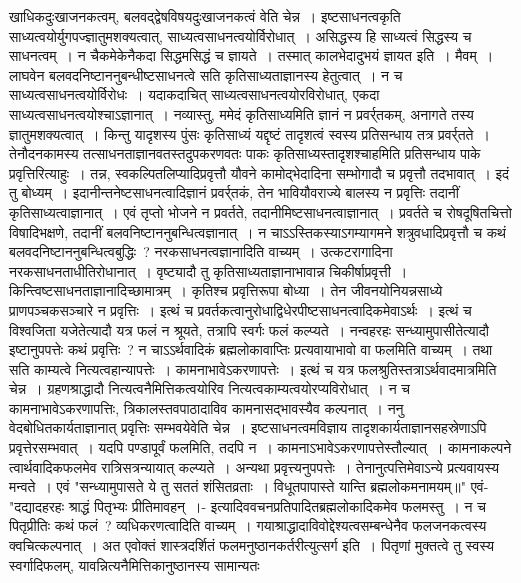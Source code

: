 खाधिकदुःखाजनकत्वम्, बलवद्द्वेषविषयदुःखाजनकत्वं वेति चेन्न~। इष्टसाधनत्वकृति साध्यत्वयोर्युगपज्ज्ञातुमशक्यत्वात्, साध्यत्वसाधनत्वयोर्विरोधात्~। असिद्धस्य हि
साध्यत्वं सिद्धस्य च साधनत्वम्~। न चैकमेकेनैकदा सिद्धमसिद्धं च ज्ञायते~। तस्मात् कालभेदादुभयं ज्ञायत इति~।
मैवम्~। लाघवेन बलवदनिष्टाननुबन्धीष्टसाधनत्वे सति कृतिसाध्यताज्ञानस्य हेतुत्वात्~। न च साध्यत्वसाधनत्वयोर्विरोधः~। यदाकदाचित् साध्यत्वसाधनत्वयोरविरोधात्,
एकदा साध्यत्वसाधनत्वयोश्चाऽज्ञानात्~। नव्यास्तु, ममेदं कृतिसाध्यमिति ज्ञानं न प्रवर्र्तकम्, अनागते तस्य ज्ञातुमशक्यत्वात्~। किन्तु यादृशस्य पुंसः कृतिसाध्यं यद्दृष्टं
तादृशत्वं स्वस्य प्रतिसन्धाय तत्र प्रवर्र्तते~। तेनौदनकामस्य तत्साधनताज्ञानवतस्तदुपकरणवतः पाकः कृतिसाध्यस्तादृशश्चाहमिति प्रतिसन्धाय पाके प्रवृत्तिरित्याहुः~।
तन्न, स्वकल्पितलिप्यादिप्रवृत्तौ यौवने कामोद्भेदादिना सम्भोगादौ च प्रवृत्तौ तदभावात्~।
इदं तु बोध्यम्~। इदानीन्तनेष्टसाधनत्वादिज्ञानं प्रवर्र्तकं, तेन भावियौवराज्ये बालस्य न प्रवृत्तिः तदानीं कृतिसाध्यत्वाज्ञानात्~। एवं तृप्तो भोजने न प्रवर्तते,
तदानीमिष्टसाधनत्वाज्ञानात्~। प्रवर्तते च रोषदूषितचित्तो विषादिभक्षणे, तदानीं बलवनिष्टाननुबन्धित्वज्ञानात्~। न चाऽऽस्तिकस्याऽगम्यागमने शत्रुवधादिप्रवृत्तौ च कथं
बलवदनिष्टाननुबन्धित्वबुद्धिः~? नरकसाधनत्वज्ञानादिति वाच्यम्~। उत्कटरागादिना नरकसाधनताधीतिरोधानात्~। वृष्ट्यादौ तु कृतिसाध्यताज्ञानाभावान्न चिकीर्षाप्रवृत्ती~।
किन्त्विष्टसाधनताज्ञानादिच्छामात्रम्~। कृतिश्च प्रवृत्तिरूपा बोध्या~। तेन जीवनयोनियन्नसाध्ये प्राणपञ्चकसञ्चारे न प्रवृत्तिः~।
इत्थं च प्रवर्तकत्वानुरोधाद्विधेरपीष्टसाधनत्वादिकमेवाऽर्थः~। इत्थं च विश्वजिता यजेतेत्यादौ यत्र फलं न श्रूयते, तत्रापि स्वर्गः फलं कल्प्यते~।
नन्वहरहः सन्ध्यामुपासीतेत्यादौ इष्टानुपपत्तेः कथं प्रवृत्तिः~? न चाऽऽर्थवादिकं ब्रह्मलोकावाप्तिः प्रत्यवायाभावो वा फलमिति वाच्यम्~। तथा सति काम्यत्वे
नित्यत्वहान्यापत्तेः~। कामनाभावेऽकरणापत्तेः~। इत्थं च यत्र फलश्रुतिस्तत्राऽर्थवादमात्रमिति चेन्न~। ग्रहणश्राद्धादौ नित्यत्वनैमित्तिकत्वयोरिव नित्यत्वकाम्यत्वयोरप्यविरोधात्~।
न च कामनाभावेऽकरणापत्तिः, त्रिकालस्तवपाठादाविव कामनासद्भावस्यैव कल्पनात्~।
ननु वेदबोधितकार्यताज्ञानात् प्रवृत्तिः सम्भवयेवेति चेन्न~। इष्टसाधनत्वमविज्ञाय तादृशकार्यताज्ञानसहस्रेणाऽपि प्रवृत्तेरसम्भवात्~।
यदपि पण्डापूर्वं फलमिति, तदपि न~। कामनाऽभावेऽकरणापत्तेस्तौल्यात्~। कामनाकल्पने त्वार्थवादिकफलमेव रात्रिसत्रन्यायात् कल्प्यते~। अन्यथा प्रवृत्त्यनुपपत्तेः~।
तेनानुत्पत्तिमेवाऽन्ये प्रत्यवायस्य मन्वते~। एवं
"सन्ध्यामुपासते ये तु सततं शंसितव्रताः~।
विधूतपापास्ते यान्ति ब्रह्मलोकमनामयम्॥"
एवं-
"दद्यादहरहः श्राद्धं पितृभ्यः प्रीतिमावहन्~।-
इत्यादिववचनप्रतिपादितब्रह्मलोकादिकमेव फलमस्तु~। न च पितृप्रीतिः कथं फलं~? व्यधिकरणत्वादिति वाच्यम्~। गयाश्राद्धादाविवोद्देश्यत्वसम्बन्धेनैव फलजनकत्वस्य
क्वचित्कल्पनात्~। अत एवोक्तं शास्त्रदर्शितं फलमनुष्ठानकर्तरीत्युत्सर्ग इति~। पितृणां मुक्तत्वे तु स्वस्य स्वर्गादिफलम्, यावन्नित्यनैमित्तिकानुष्ठानस्य सामान्यतः
